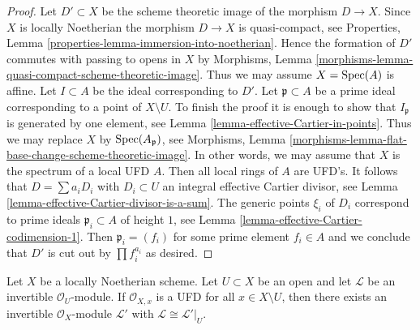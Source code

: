 \begin{proof}
Let $D' \subset X$ be the scheme theoretic image of the morphism $D \to X$.
Since $X$ is locally Noetherian the morphism $D \to X$ is quasi-compact, see
Properties, Lemma \ref{properties-lemma-immersion-into-noetherian}.
Hence the formation of $D'$ commutes with passing to opens in $X$ by
Morphisms, Lemma \ref{morphisms-lemma-quasi-compact-scheme-theoretic-image}.
Thus we may assume $X = \mathop{\mathrm{Spec}}(A)$ is affine.
Let $I \subset A$ be the ideal corresponding to $D'$.
Let $\mathfrak p \subset A$ be a prime ideal corresponding to a point
of $X \setminus U$.
To finish the proof it is enough to show that $I_\mathfrak p$ is generated
by one element, see Lemma \ref{lemma-effective-Cartier-in-points}.
Thus we may replace $X$ by $\mathop{\mathrm{Spec}}(A_\mathfrak p)$, see
Morphisms, Lemma \ref{morphisms-lemma-flat-base-change-scheme-theoretic-image}.
In other words, we may assume that $X$ is the spectrum of a local
UFD $A$. Then all local rings of $A$ are UFD's. It follows that
$D = \sum a_i D_i$ with $D_i \subset U$ an integral effective Cartier divisor,
see Lemma \ref{lemma-effective-Cartier-divisor-is-a-sum}.
The generic points $\xi_i$ of $D_i$ correspond to prime ideals
$\mathfrak p_i \subset A$ of height $1$, see
Lemma \ref{lemma-effective-Cartier-codimension-1}.
Then $\mathfrak p_i = (f_i)$ for some prime element $f_i \in A$
and we conclude that $D'$ is cut out by $\prod f_i^{a_i}$ as desired.
\end{proof}

\begin{lemma}
\label{lemma-extend-invertible-module}
Let $X$ be a locally Noetherian scheme. Let $U \subset X$ be
an open and let $\mathcal{L}$ be an invertible $\mathcal{O}_U$-module.
If $\mathcal{O}_{X, x}$ is a UFD for all $x \in X \setminus U$,
then there exists an invertible $\mathcal{O}_X$-module $\mathcal{L}'$
with $\mathcal{L} \cong \mathcal{L}'|_U$.
\end{lemma}

